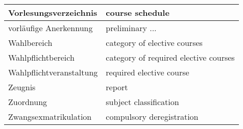 \begin{longtable} {|p{.5\linewidth}|p{.5\linewidth}|}
\hline
Vorlesungsverzeichnis & course schedule\\
\hline
vorläufige Anerkennung & preliminary ...\\
\hline
Wahlbereich & category of elective courses\\
\hline
Wahlpflichtbereich & category of required elective courses\\
\hline
Wahlpflichtveranstaltung & required elective course\\
\hline
Zeugnis & report\\
\hline
Zuordnung & subject classification\\
\hline
Zwangsexmatrikulation & compulsory deregistration\\
\hline
\end{longtable}






